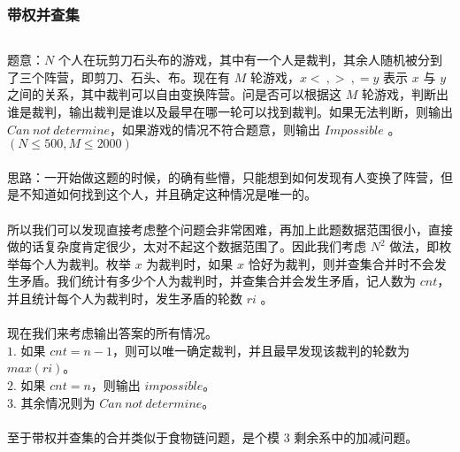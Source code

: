 \documentclass[twoside]{article}
\begin{document}
\subsubsection{带权并查集}
\begin{lstlisting}
\end{lstlisting}
题意：$N$ 个人在玩剪刀石头布的游戏，其中有一个人是裁判，其余人随机被分到了三个阵营，即剪刀、石头、布。现在有 $M$ 轮游戏，$x <\ ,>\ ,= y$ 表示 $x$ 与 $y$ 之间的关系，其中裁判可以自由变换阵营。问是否可以根据这 $M$ 轮游戏，判断出谁是裁判，输出裁判是谁以及最早在哪一轮可以找到裁判。如果无法判断，则输出 $Can\ not\ determine$，如果游戏的情况不符合题意，则输出 $Impossible$ 。$(N\leq 500,M\leq 2000)$\\
\\
思路：一开始做这题的时候，的确有些懵，只能想到如何发现有人变换了阵营，但是不知道如何找到这个人，并且确定这种情况是唯一的。\\
\\
所以我们可以发现直接考虑整个问题会非常困难，再加上此题数据范围很小，直接做的话复杂度肯定很少，太对不起这个数据范围了。因此我们考虑 $N^2$ 做法，即枚举每个人为裁判。枚举 $x$ 为裁判时，如果 $x$ 恰好为裁判，则并查集合并时不会发生矛盾。我们统计有多少个人为裁判时，并查集合并会发生矛盾，记人数为 $cnt$，并且统计每个人为裁判时，发生矛盾的轮数 $ri$ 。\\
\\
现在我们来考虑输出答案的所有情况。\\
$1.$ 如果 $cnt = n-1$，则可以唯一确定裁判，并且最早发现该裁判的轮数为 $max(ri)$。\\
$2.$ 如果 $cnt = n$，则输出 $impossible$。\\
$3.$ 其余情况则为 $Can\ not\ determine$。\\
\\
至于带权并查集的合并类似于食物链问题，是个模 $3$ 剩余系中的加减问题。\\
\end{document}
